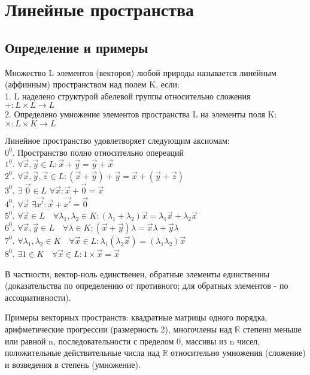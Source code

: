 \section{Линейные пространства}
\subsection{Определение и примеры}
\begin{defin}
Множество L элементов (векторов) любой природы называется линейным (аффинным)
пространством над полем K, если:\\
1. L наделено структурой абелевой группы относительно сложения\\
$+\colon L\times L\to L$\\
2. Определено умножение элементов пространства L на элементы поля K:
\\ $\times \colon L\times K \to L$
\end{defin} 
Линейное пространство удовлетворяет следующим аксиомам:\\
$0^0$. Пространство полно относительно опереаций\\
$1^0$. $\forall \Vec{x}, \Vec{y} \in L: \Vec{x}+\Vec{y}=\Vec{y}+\Vec{x}$\\
$2^0$. $\forall  \Vec{x}, \Vec{y}, \Vec{z} \in L: (\Vec{x}+\Vec{y})+\Vec{y}=
\Vec{x}+(\Vec{y}+\Vec{z})$\\
$3^0$. $\exists$ $\Vec{0}\in L$ $\forall \Vec{x}: \Vec{x}+\Vec{0}=\Vec{x}$\\
$4^0$. $\forall \Vec{x}$ $\exists \Vec{x'}: \Vec{x}+\Vec{x'}=\Vec{0}$\\
$5^0$. $\forall \Vec{x} \in L \quad\forall \lambda_1,\lambda_2 \in K: 
(\lambda_1+\lambda_2)\Vec{x}=\lambda_1\Vec{x}+\lambda_2\Vec{x} $\\
$6^0$. $\forall \Vec{x},\Vec{y}\in L\quad \forall \lambda \in K:
(\Vec{x}+\Vec{y})\lambda=\Vec{x}\lambda+\Vec{y}\lambda $\\
$7^0$. $\forall \lambda_1,\lambda_2 \in K \quad \forall \Vec{x} \in L:
\lambda_1(\lambda_2\Vec{x})=(\lambda_1\lambda_2)\Vec{x}$\\
$8^0$. $\exists 1 \in K \quad\forall \Vec{x} \in L: 1\times\Vec{x}=\Vec{x}$

В частности, вектор-ноль единственен, обратные элементы единственны 
(доказательства по определению от противного; для обратных элементов
- по ассоциативности).

Примеры векторных пространств: квадратные матрицы одного порядка,
арифметические прогрессии (размерность 2), многочлены над $\mathbb{R}$
степени меньше или равной n, последовательности с пределом 0, массивы
из n чисел, положительные действительные числа над $\mathbb{R}$ относительно
умножения (сложение) и возведения в степень (умножение).
